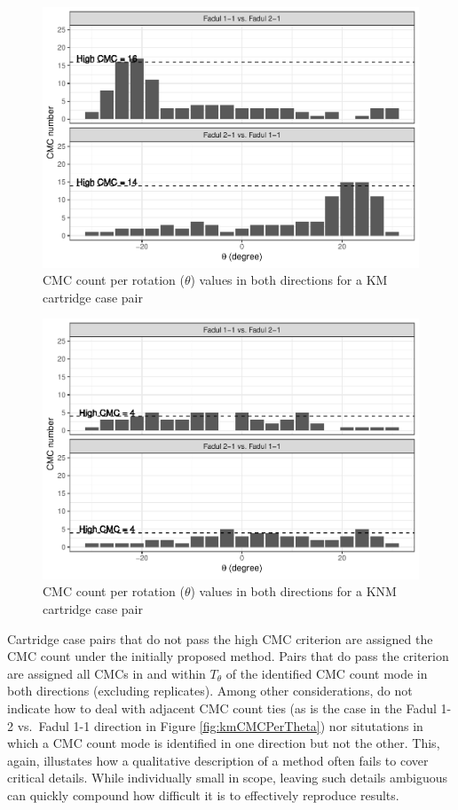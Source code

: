 \begin{Schunk}
\begin{figure}[h]

{\centering \includegraphics[width=.7\textwidth]{cmcR_files/figure-latex/unnamed-chunk-3-1} 

}

\caption{\label{fig:kmCMCPerTheta} CMC count per rotation ($\theta$) values in both directions for a KM cartridge case pair}\label{fig:unnamed-chunk-3}
\end{figure}
\end{Schunk}

\begin{Schunk}
\begin{figure}[h]

{\centering \includegraphics[width=.7\textwidth]{cmcR_files/figure-latex/unnamed-chunk-5-1} 

}

\caption{\label{fig:knmCMCPerTheta} CMC count per rotation ($\theta$) values in both directions for a KNM cartridge case pair}\label{fig:unnamed-chunk-5}
\end{figure}
\end{Schunk}

Cartridge case pairs that do not pass the high CMC criterion are
assigned the CMC count under the initially proposed method. Pairs that
do pass the criterion are assigned all CMCs in and within \(T_\theta\)
of the identified CMC count mode in both directions (excluding
replicates). Among other considerations, \citet{tong_improved_2015} do
not indicate how to deal with adjacent CMC count ties (as is the case in
the Fadul 1-2 vs.~Fadul 1-1 direction in Figure \ref{fig:kmCMCPerTheta})
nor situtations in which a CMC count mode is identified in one direction
but not the other. This, again, illustates how a qualitative description
of a method often fails to cover critical details. While individually
small in scope, leaving such details ambiguous can quickly compound how
difficult it is to effectively reproduce results.

